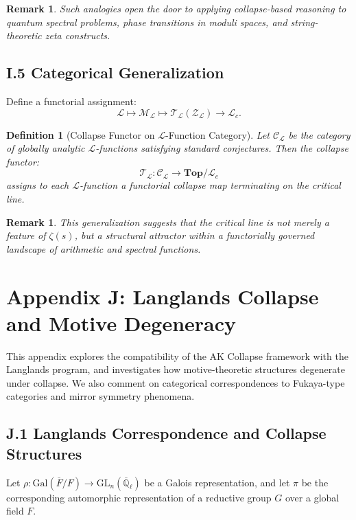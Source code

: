 \documentclass[11pt]{article}
\newtheorem{definition}[theorem]{Definition}
\newtheorem{remark}[theorem]{Remark}
\newcommand{\QQ}{\mathbb{Q}}
\begin{document}
\begin{remark}
Such analogies open the door to applying collapse-based reasoning to quantum spectral problems,  
phase transitions in moduli spaces, and string-theoretic zeta constructs.
\end{remark}

\subsection*{I.5 Categorical Generalization}

Define a functorial assignment:
\[
\mathcal{L} \mapsto \mathcal{M}_{\mathcal{L}} \mapsto \mathcal{T}_{\mathcal{L}}(\mathcal{Z}_{\mathcal{L}}) \to \mathcal{L}_c.
\]

\begin{definition}[Collapse Functor on $\mathcal{L}$-Function Category]
Let $\mathcal{C}_\mathcal{L}$ be the category of globally analytic $\mathcal{L}$-functions satisfying standard conjectures.  
Then the collapse functor:
\[
\mathcal{T}_\mathcal{L} : \mathcal{C}_\mathcal{L} \to \textbf{Top}/\mathcal{L}_c
\]
assigns to each $\mathcal{L}$-function a functorial collapse map terminating on the critical line.
\end{definition}

\begin{remark}
This generalization suggests that the critical line is not merely a feature of $\zeta(s)$,  
but a structural attractor within a functorially governed landscape of arithmetic and spectral functions.
\end{remark}



\section*{Appendix J: Langlands Collapse and Motive Degeneracy}

This appendix explores the compatibility of the AK Collapse framework with the Langlands program,  
and investigates how motive-theoretic structures degenerate under collapse.  
We also comment on categorical correspondences to Fukaya-type categories and mirror symmetry phenomena.

\subsection*{J.1 Langlands Correspondence and Collapse Structures}

Let $\rho : \mathrm{Gal}(\overline{F}/F) \to \mathrm{GL}_n(\overline{\QQ}_\ell)$ be a Galois representation,  
and let $\pi$ be the corresponding automorphic representation of a reductive group $G$ over a global field $F$.
\end{document}
